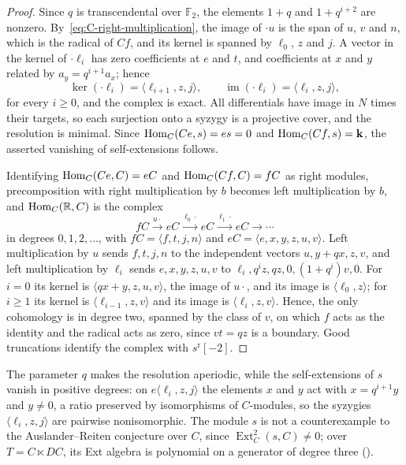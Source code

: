 \begin{proof}
  Since $q$ is transcendental over $\mathbb{F}_2$, the elements ${1+q}$ and
  ${1+q^{i+2}}$ are nonzero. By~\eqref{eq:C-right-multiplication}, the image of
  ${\cdot u}$ is the span of $u$, $v$ and $n$, which is the radical of $Cf$, and
  its kernel is spanned by $\ell_0$, $z$ and $j$. A vector in the kernel of
  ${\cdot\ell_i}$ has zero coefficients at $e$ and $t$, and coefficients at $x$
  and $y$ related by ${a_y=q^{i+1}a_x}$; hence
  \[
    \ker(\cdot\ell_i)=\langle\ell_{i+1},z,j\rangle,\qquad
    \operatorname{im}(\cdot\ell_i)=\langle\ell_i,z,j\rangle,
  \]
  for every ${i\geq0}$, and the complex is exact. All differentials have image
  in $N$ times their targets, so each surjection onto a syzygy is a projective
  cover, and the resolution is minimal. Since ${\Hom[C]{Ce}{s}=es=0}$ and
  ${\Hom[C]{Cf}{s}=\kk}$, the asserted vanishing of self-extensions follows.

  Identifying ${\Hom[C]{Ce}{C}=eC}$ and ${\Hom[C]{Cf}{C}=fC}$ as right modules,
  precomposition with right multiplication by $b$ becomes left multiplication
  by $b$, and $\Hom[C]{\mathbb{R}}{C}$ is the complex
  \[
    fC\xrightarrow{u\cdot}eC\xrightarrow{\ell_0\cdot}eC\xrightarrow{\ell_1\cdot}
    eC\longrightarrow\cdots
  \]
  in degrees $0,1,2,\dots$, with ${fC=\langle f,t,j,n\rangle}$ and
  ${eC=\langle e,x,y,z,u,v\rangle}$. Left multiplication by $u$ sends
  $f,t,j,n$ to the independent vectors ${u,y+qx,z,v}$, and left multiplication
  by $\ell_i$ sends $e,x,y,z,u,v$ to ${\ell_i,q^iz,qz,0,(1+q^i)v,0}$. For ${i=0}$
  its kernel is ${\langle qx+y,z,u,v\rangle}$, the image of ${u\cdot}$, and its
  image is $\langle\ell_0,z\rangle$; for ${i\geq1}$ its kernel is
  $\langle\ell_{i-1},z,v\rangle$ and its image is $\langle\ell_i,z,v\rangle$.
  Hence, the only cohomology is in degree two, spanned by the class of $v$,
  on which $f$ acts as the identity and the radical acts as zero, since
  ${vt=qz}$ is a boundary. Good truncations identify the complex with
  ${s^{\mathrm{r}}[-2]}$.
\end{proof}

The parameter $q$ makes the resolution aperiodic, while the self-extensions of
$s$ vanish in positive degrees: on $e\langle\ell_i,z,j\rangle$ the elements $x$
and $y$ act with ${x=q^{i+1}y}$ and ${y\neq0}$, a ratio preserved by isomorphisms of
$C$-modules, so the syzygies $\langle\ell_i,z,j\rangle$ are pairwise
nonisomorphic. The module $s$ is not a counterexample to the Auslander--Reiten
conjecture over $C$, since ${\operatorname{Ext}^2_C(s,C)\neq0}$; over ${T=C\ltimes
DC}$, its Ext algebra is polynomial on a generator of degree three
().

